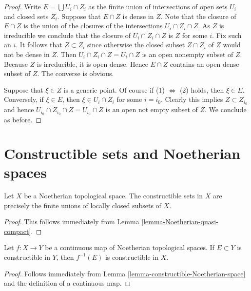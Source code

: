 \begin{proof}
Write $E = \bigcup U_i \cap Z_i$ as the finite union of
intersections of open sets $U_i$ and closed sets $Z_i$.
Suppose that $E \cap Z$ is dense in $Z$. Note that
the closure of $E \cap Z$ is the union of the closures
of the intersections $U_i \cap Z_i \cap Z$. As $Z$ is irreducible we
conclude that the closure of $U_i \cap Z_i \cap Z$ is $Z$ for some $i$.
Fix such an $i$. It follows that $Z \subset Z_i$ since otherwise
the closed subset $Z \cap Z_i$ of $Z$ would not be dense in $Z$.
Then $U_i \cap Z_i \cap Z = U_i \cap Z$ is an open nonempty subset of $Z$.
Because $Z$ is irreducible, it is open dense. Hence $E \cap Z$
contains an open dense subset of $Z$.
The converse is obvious.

\medskip\noindent
Suppose that $\xi \in Z$ is a generic point. Of course if
(1) $\Leftrightarrow$ (2) holds, then $\xi \in E$. Conversely,
if $\xi \in E$, then $\xi \in U_i \cap Z_i$ for some $i = i_0$.
Clearly this implies $Z \subset Z_{i_0}$ and hence
$U_{i_0} \cap Z_{i_0} \cap Z = U_{i_0} \cap Z$ is an open
not empty subset of $Z$. We conclude as before.
\end{proof}







\section{Constructible sets and Noetherian spaces}
\label{section-constructible-Noetherian}

\begin{lemma}
\label{lemma-constructible-Noetherian-space}
Let $X$ be a Noetherian topological space.
The constructible sets in $X$ are precisely the finite unions
of locally closed subsets of $X$.
\end{lemma}

\begin{proof}
This follows immediately from
Lemma \ref{lemma-Noetherian-quasi-compact}.
\end{proof}

\begin{lemma}
\label{lemma-constructible-map-Noetherian}
Let $f : X \to Y$ be a continuous map of Noetherian topological spaces.
If $E \subset Y$ is constructible in $Y$, then $f^{-1}(E)$ is constructible
in $X$.
\end{lemma}

\begin{proof}
Follows immediately from
Lemma \ref{lemma-constructible-Noetherian-space}
and the definition of a continuous map.
\end{proof}

